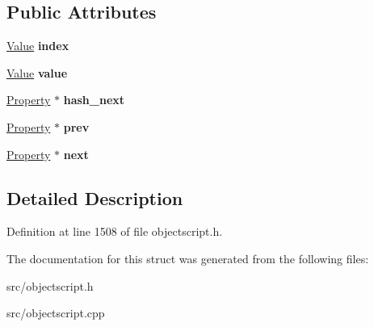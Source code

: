 \subsection*{Public Attributes}
\begin{DoxyCompactItemize}
\item 
\hyperlink{struct_object_script_1_1_o_s_1_1_core_1_1_value}{Value} {\bfseries index}\hypertarget{struct_object_script_1_1_o_s_1_1_core_1_1_property_ae1f5a509438fd4b3fb82da14200133b8}{}\label{struct_object_script_1_1_o_s_1_1_core_1_1_property_ae1f5a509438fd4b3fb82da14200133b8}

\item 
\hyperlink{struct_object_script_1_1_o_s_1_1_core_1_1_value}{Value} {\bfseries value}\hypertarget{struct_object_script_1_1_o_s_1_1_core_1_1_property_ac0019ca76e3455acacbef1d2f1ad3da8}{}\label{struct_object_script_1_1_o_s_1_1_core_1_1_property_ac0019ca76e3455acacbef1d2f1ad3da8}

\item 
\hyperlink{struct_object_script_1_1_o_s_1_1_core_1_1_property}{Property} $\ast$ {\bfseries hash\+\_\+next}\hypertarget{struct_object_script_1_1_o_s_1_1_core_1_1_property_a7bf79422fe9d5be2038487277900e0ef}{}\label{struct_object_script_1_1_o_s_1_1_core_1_1_property_a7bf79422fe9d5be2038487277900e0ef}

\item 
\hyperlink{struct_object_script_1_1_o_s_1_1_core_1_1_property}{Property} $\ast$ {\bfseries prev}\hypertarget{struct_object_script_1_1_o_s_1_1_core_1_1_property_a6be9da57af293b564a01e9013418d974}{}\label{struct_object_script_1_1_o_s_1_1_core_1_1_property_a6be9da57af293b564a01e9013418d974}

\item 
\hyperlink{struct_object_script_1_1_o_s_1_1_core_1_1_property}{Property} $\ast$ {\bfseries next}\hypertarget{struct_object_script_1_1_o_s_1_1_core_1_1_property_a184f7cf98ecb0a2b872d52edf703f2bf}{}\label{struct_object_script_1_1_o_s_1_1_core_1_1_property_a184f7cf98ecb0a2b872d52edf703f2bf}

\end{DoxyCompactItemize}


\subsection{Detailed Description}


Definition at line 1508 of file objectscript.\+h.



The documentation for this struct was generated from the following files\+:\begin{DoxyCompactItemize}
\item 
src/objectscript.\+h\item 
src/objectscript.\+cpp\end{DoxyCompactItemize}
